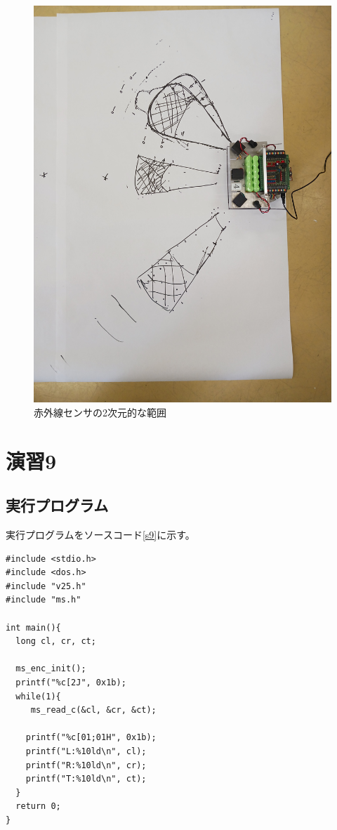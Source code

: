 \begin{figure}[H]
  \begin{center}
  \includegraphics[width=.8\columnwidth]{img/8.jpg}
  \caption{赤外線センサの2次元的な範囲}
  \label{niji}
  \end{center}
\end{figure}

\section{演習9}
\subsection{実行プログラム}
実行プログラムをソースコード\ref{s9}に示す。
\begin{lstlisting}[caption=演習9のプログラム,label=s9]
#include <stdio.h>
#include <dos.h>
#include "v25.h"
#include "ms.h"
  
int main(){
  long cl, cr, ct;
  
  ms_enc_init();
  printf("%c[2J", 0x1b);
  while(1){
     ms_read_c(&cl, &cr, &ct);
  
    printf("%c[01;01H", 0x1b);
    printf("L:%10ld\n", cl);
    printf("R:%10ld\n", cr);
    printf("T:%10ld\n", ct);
  }
  return 0;
}
\end{lstlisting}

